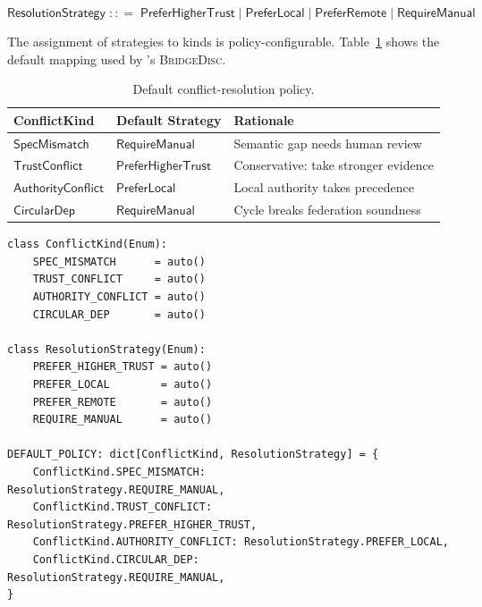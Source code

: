 \documentclass[11pt]{article}
\newcommand{\ResolS}{\ensuremath{\mathsf{ResolutionStrategy}}}
\newcommand{\BD}{\textsc{BridgeDisc}}
\begin{document}
\begin{definition}[ResolutionStrategy]
\label{def:resolution}
\[
  \ResolS \;{:}{:}{=}\;
  \mathsf{PreferHigherTrust}
  \mid \mathsf{PreferLocal}
  \mid \mathsf{PreferRemote}
  \mid \mathsf{RequireManual}
\]
\end{definition}

The assignment of strategies to kinds is policy-configurable.
Table~\ref{tab:default-resolution} shows the default mapping used by
\JuGeo{}'s \BD{}.

\begin{table}[h]
\centering
\caption{Default conflict-resolution policy.}
\label{tab:default-resolution}
\begin{tabular}{lll}
\toprule
\textbf{ConflictKind} & \textbf{Default Strategy} & \textbf{Rationale} \\
\midrule
$\mathsf{SpecMismatch}$      & $\mathsf{RequireManual}$    & Semantic gap needs human review \\
$\mathsf{TrustConflict}$     & $\mathsf{PreferHigherTrust}$& Conservative: take stronger evidence \\
$\mathsf{AuthorityConflict}$ & $\mathsf{PreferLocal}$      & Local authority takes precedence \\
$\mathsf{CircularDep}$       & $\mathsf{RequireManual}$    & Cycle breaks federation soundness \\
\bottomrule
\end{tabular}
\end{table}

\begin{lstlisting}[style=jugeo-python, caption={ConflictKind and ResolutionStrategy enums.}]
class ConflictKind(Enum):
    SPEC_MISMATCH      = auto()
    TRUST_CONFLICT     = auto()
    AUTHORITY_CONFLICT = auto()
    CIRCULAR_DEP       = auto()

class ResolutionStrategy(Enum):
    PREFER_HIGHER_TRUST = auto()
    PREFER_LOCAL        = auto()
    PREFER_REMOTE       = auto()
    REQUIRE_MANUAL      = auto()

DEFAULT_POLICY: dict[ConflictKind, ResolutionStrategy] = {
    ConflictKind.SPEC_MISMATCH:      ResolutionStrategy.REQUIRE_MANUAL,
    ConflictKind.TRUST_CONFLICT:     ResolutionStrategy.PREFER_HIGHER_TRUST,
    ConflictKind.AUTHORITY_CONFLICT: ResolutionStrategy.PREFER_LOCAL,
    ConflictKind.CIRCULAR_DEP:       ResolutionStrategy.REQUIRE_MANUAL,
}
\end{lstlisting}
\end{document}
